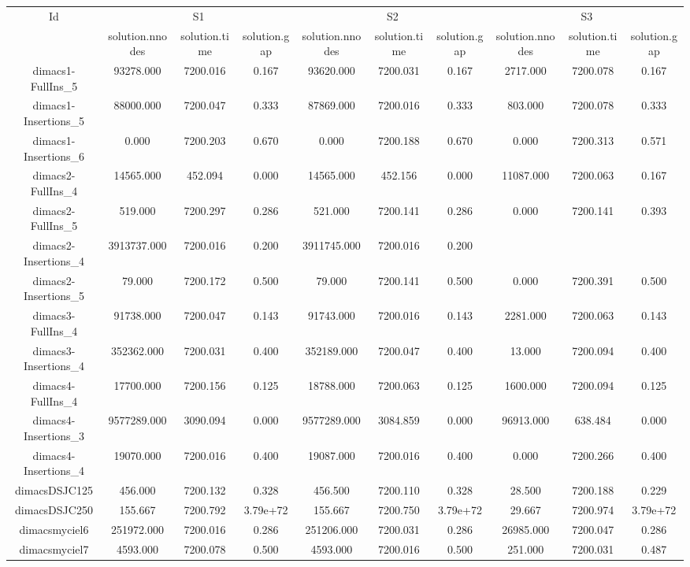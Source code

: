 \documentclass[landscape, 12pt]{report}
\begin{document}
\begin{tabular}{|c|ccc|ccc|ccc|}
\hline
\multicolumn{1}{|c|}{Id} & \multicolumn{3}{|c|}{S1} & \multicolumn{3}{|c|}{S2} & \multicolumn{3}{|c|}{S3}
\\
 & solution.nnodes & solution.time & solution.gap & solution.nnodes & solution.time & solution.gap & solution.nnodes & solution.time & solution.gap
\\
\hline
dimacs1-FullIns\_5 & 93278.000 & 7200.016 & 0.167 & 93620.000 & 7200.031 & 0.167 & 2717.000 & 7200.078 & 0.167
\\
dimacs1-Insertions\_5 & 88000.000 & 7200.047 & 0.333 & 87869.000 & 7200.016 & 0.333 & 803.000 & 7200.078 & 0.333
\\
dimacs1-Insertions\_6 & 0.000 & 7200.203 & 0.670 & 0.000 & 7200.188 & 0.670 & 0.000 & 7200.313 & 0.571
\\
dimacs2-FullIns\_4 & 14565.000 & 452.094 & 0.000 & 14565.000 & 452.156 & 0.000 & 11087.000 & 7200.063 & 0.167
\\
dimacs2-FullIns\_5 & 519.000 & 7200.297 & 0.286 & 521.000 & 7200.141 & 0.286 & 0.000 & 7200.141 & 0.393
\\
dimacs2-Insertions\_4 & 3913737.000 & 7200.016 & 0.200 & 3911745.000 & 7200.016 & 0.200
\\
dimacs2-Insertions\_5 & 79.000 & 7200.172 & 0.500 & 79.000 & 7200.141 & 0.500 & 0.000 & 7200.391 & 0.500
\\
dimacs3-FullIns\_4 & 91738.000 & 7200.047 & 0.143 & 91743.000 & 7200.016 & 0.143 & 2281.000 & 7200.063 & 0.143
\\
dimacs3-Insertions\_4 & 352362.000 & 7200.031 & 0.400 & 352189.000 & 7200.047 & 0.400 & 13.000 & 7200.094 & 0.400
\\
dimacs4-FullIns\_4 & 17700.000 & 7200.156 & 0.125 & 18788.000 & 7200.063 & 0.125 & 1600.000 & 7200.094 & 0.125
\\
dimacs4-Insertions\_3 & 9577289.000 & 3090.094 & 0.000 & 9577289.000 & 3084.859 & 0.000 & 96913.000 & 638.484 & 0.000
\\
dimacs4-Insertions\_4 & 19070.000 & 7200.016 & 0.400 & 19087.000 & 7200.016 & 0.400 & 0.000 & 7200.266 & 0.400
\\
dimacsDSJC125 & 456.000 & 7200.132 & 0.328 & 456.500 & 7200.110 & 0.328 & 28.500 & 7200.188 & 0.229
\\
dimacsDSJC250 & 155.667 & 7200.792 & 3.79e+72 & 155.667 & 7200.750 & 3.79e+72 & 29.667 & 7200.974 & 3.79e+72
\\
dimacsmyciel6 & 251972.000 & 7200.016 & 0.286 & 251206.000 & 7200.031 & 0.286 & 26985.000 & 7200.047 & 0.286
\\
dimacsmyciel7 & 4593.000 & 7200.078 & 0.500 & 4593.000 & 7200.016 & 0.500 & 251.000 & 7200.031 & 0.487
\\
\hline 
 \end{tabular}
 
\end{document}
